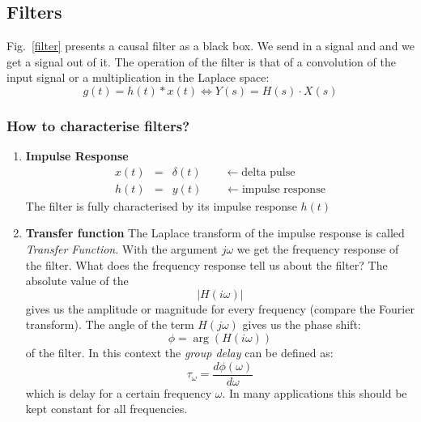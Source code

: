 \documentclass[12pt,a4paper]{article}
\begin{document}
\subsection{Filters}
Fig.~\ref{filter} presents a causal filter as a black box. We
send in a signal and and we get a signal out of it. The
operation of the filter is that of a convolution of the input
signal or a multiplication in the Laplace space:
\begin{equation} 
g(t) = h(t) * x(t) \Leftrightarrow Y(s) = H(s) \cdot X(s)
\end{equation}

\subsubsection{How to characterise filters?}

\begin{enumerate}
\item{\bf Impulse Response}
\begin{eqnarray}
x(t) & = & \delta(t) \qquad \leftarrow \mbox{delta pulse} \\
h(t) & = & y(t) \qquad \leftarrow \mbox{impulse response}
\end{eqnarray}
The filter is fully characterised by its impulse response $h(t)$

\item{\bf Transfer function}
The Laplace transform of the impulse response is called
\textsl{Transfer Function}. With the argument $j\omega$ we
get the frequency
response of the filter. What does the frequency response tell us about
the filter?  The absolute value of the
\begin{equation}
|H(i \omega)|
\end{equation}
gives us the amplitude or magnitude for every frequency
(compare the Fourier transform).
The angle of the term $H(j\omega)$ gives us the phase shift:
\begin{equation}
\phi = \arg\left(H(i \omega) \right)
\end{equation}
of the filter. In this context the \textsl{group delay} can
be defined as:
\begin{equation}
\tau_{\omega} = \frac{d \phi (\omega)}{d\omega}
\end{equation}
which is delay for a certain frequency $\omega$. In many applications
this should be kept constant for all frequencies.
\end{enumerate}
\end{document}
